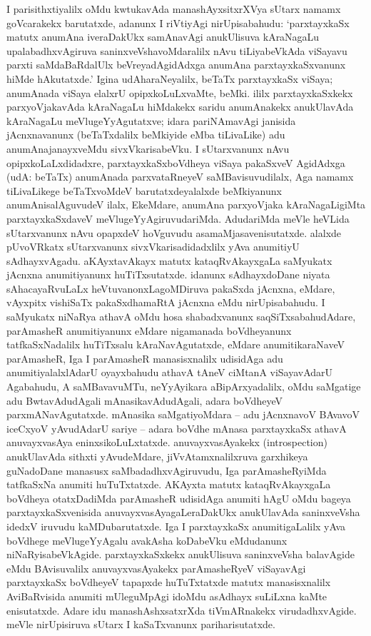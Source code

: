I parisithxtiyalilx oMdu kwtukavAda manashAyxsitxrXVya sUtarx namamx goVcarakekx baru\-tatxde, adanunx I riVtiyAgi nirUpisabahudu: `parxtayxkaSx matutx anumAna iveraDakUkx samAnavAgi anukUlisuva kAraNagaLu upalabadhxvAgiruva saninxveVshavoMdaralilx nAvu tiLiyabeVkAda viSayavu parxti saMdaBaRdalUlx beVreyadAgidAdxga anumAna parxtayxkaSx\-vanunx hiMde hAkutatxde.' Igina udAharaNeyalilx, beTaTx parxtayxkaSx viSaya; anumAnada viSaya elalxrU opipxkoLuLxvaMte, beMki. ililx parxtayxkaSxkekx parxyoVjakavAda kAraNagaLu hiMdakekx saridu anumAnakekx anukUlavAda kAraNagaLu meVlugeYyAgutatxve; idara pariNAmavAgi janisida jAcnxnavanunx (beTaTxdalilx beMkiyide eMba tiLivaLike) adu anu\-mAna\-janayxveMdu sivxVkarisabeVku. I sUtarxvanunx nAvu opipxkoLaLxdidadxre, parxtayxkaSx\break boVdheya viSaya pakaSxveV AgidAdxga (udA: beTaTx) anumAnada parxvataRneyeV saMBavi\-suvudilalx, Aga namamx tiLivaLikege beTaTxvoMdeV barutatxdeyalalxde beMkiyanunx anu\-mAnisa\-lAguvudeV ilalx, EkeMdare, anumAna parxyoVjaka kAraNagaLigiMta parxtayxkaSxdaveV meVlu\-geYyAgiruvudariMda. AdudariMda meVle heVLida sUtarxvanunx nAvu opapxdeV hoVgu\-vudu asamaMjasavenisutatxde. alalxde pUvoVRkatx sUtarxvanunx sivxVkarisadidadxlilx yAva anumitiyU sAdhayxvAgadu. aKAyxtavAkayx matutx kataqRvAkayxgaLa saMyukatx \hbox{jAcnxna} anu\-mitiyanunx huTiTxsutatxde. idanunx sAdhayxdoDane niyata sAhacayaRvuLaLx heVtu\-vanonxLa\-goMDiruva pakaSxda jAcnxna, eMdare, vAyxpitx vishiSaTx pakaSxdhamaRtA jAcnxna eMdu nirUpisa\-bahudu. I saMyukatx niNaRya athavA oMdu hosa shabadxvanunx saqSiTxsabahudAdare, parAmasheR anumitiyanunx eMdare nigamanada boVdheyanunx tatfkaSxNadalilx huTiTxsalu kAraNavAgutatxde, eMdare anumitikaraNaveV parAmasheR, Iga I parAmasheR manasisx\-nalilx udisidAga adu anumitiyalalxlAdarU oyayxbahudu athavA tAneV \hbox{ciMtanA} viSayavAdarU Agabahudu, A saMBavavuMTu, neYyAyikara aBipArxya\-dalilx, oMdu saMgatige adu BwtavAdudAgali mAnasikavAdudAgali, adara boVdheyeV parxmANa\-vAgutatxde. mAnasika saMgatiyoMdara -- adu jAcnxnavoV BAvavoV iceCxyoV yAvudAdarU sariye -- adara boVdhe mAnasa parxtayxkaSx athavA anuvayxvasAya eninxsi\-koLuLxtatxde. anuvayxvasAyakekx {\rm(introspection)} anukUlavAda sithxti yAvu\-deMdare, jiVvAtamxnalilxruva garxhikeya guNadoDane manasusx saMbadadhxvAgiruvudu, Iga parA\-masheR\-yiMda tatfkaSxNa anumiti huTuTxtatxde. AKAyxta matutx kataqRvAkayxgaLa boVdheya otatxDa\-diMda parAmasheR udisidAga anumiti hAgU oMdu bageya parxtayxkaSxvenisida anu\-vayxvasAyagaLeraDakUkx anukUlavAda saninxveVsha idedxV iruvudu kaMDubarutatxde. Iga I parxtayxkaSx anumitigaLalilx yAva boVdhege meVlugeYyAgalu avakAsha koDabeVku eMdudanunx niNaRyisabeVkAgide. parxtayxkaSxkekx anukUlisuva saninxveVsha balavAgide eMdu BAvisuvalilx anuvayxvasAyakekx parAmasheRyeV viSayavAgi parxtayxkaSx boVdheyeV \hbox{tapapxde} huTuTxtatxde matutx manasisxnalilx AviBaRvisida anumiti mUleguMpAgi idoMdu \hbox{asAdhayx} suLiLxna kaMte enisutatxde. Adare idu manashAshxsatxrXda tiVmARnakekx virudadhxvAgide. meVle nirUpisiruva sUtarx I kaSaTxvanunx pariharisutatxde.

